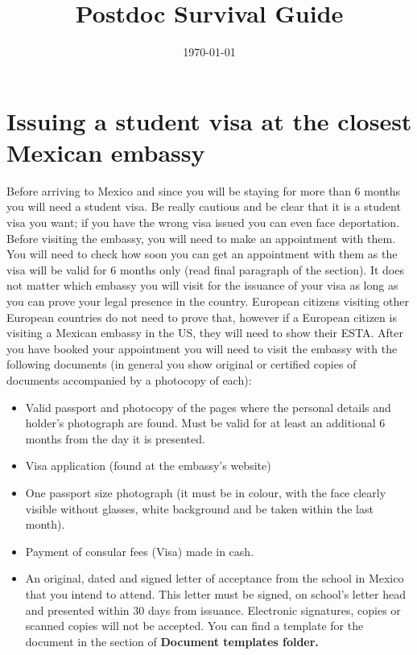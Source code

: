 \documentclass{article}
\title{Postdoc Survival Guide}
\author{}
\date{\today}
\begin{document}
\maketitle

\section{Issuing a student visa at the closest Mexican embassy}

Before arriving to Mexico and since you will be staying for more than 6 months you will need a student visa. Be really cautious and be clear that it is a student visa you want; if you have the wrong visa issued you can even face deportation. Before visiting the embassy, you will need to make an appointment with them. You will need to check how soon you can get an appointment with them as the visa will be valid for 6 months only (read final paragraph of the section). It does not matter which embassy you will visit for the issuance of your visa as long as you can prove your legal presence in the country. European citizens visiting other European countries do not need to prove that, however if a European citizen is visiting a Mexican embassy in the US, they will need to show their ESTA. After you have booked your appointment you will need to visit the embassy with the following documents (in general you show original or certified copies of documents accompanied by a photocopy of each):


\begin{itemize}
\item Valid passport and photocopy of the pages where the personal details and holder's photograph are found. Must be valid for at least an additional 6 months from the day it is presented.
\item Visa application (found at the embassy's website)
\item One passport size photograph (it must be in colour, with the face clearly visible without glasses, white background and be taken within the last month). 
\item Payment of consular fees (Visa) made in cash.
\item An original, dated and signed letter of acceptance from the school in Mexico that you intend to attend. This letter must be signed, on school's letter head and presented within 30 days from issuance. Electronic signatures, copies or scanned copies will not be accepted. You can find a template for the document in the section of \textbf{Document templates folder.}
\end{itemize}
\end{document}
